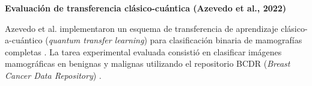 \textbf{Evaluación de transferencia clásico-cuántica (Azevedo et al., 2022)}

Azevedo et al. implementaron un esquema de transferencia de aprendizaje clásico-a-cuántico (\textit{quantum transfer learning}) para clasificación binaria de mamografías completas \cite{Azevedo2022QuantumTransfer}.
La tarea experimental evaluada consistió en clasificar imágenes mamográficas en benignas y malignas utilizando el repositorio BCDR (\textit{Breast Cancer Data Repository}) \cite{Azevedo2022QuantumTransfer}.


